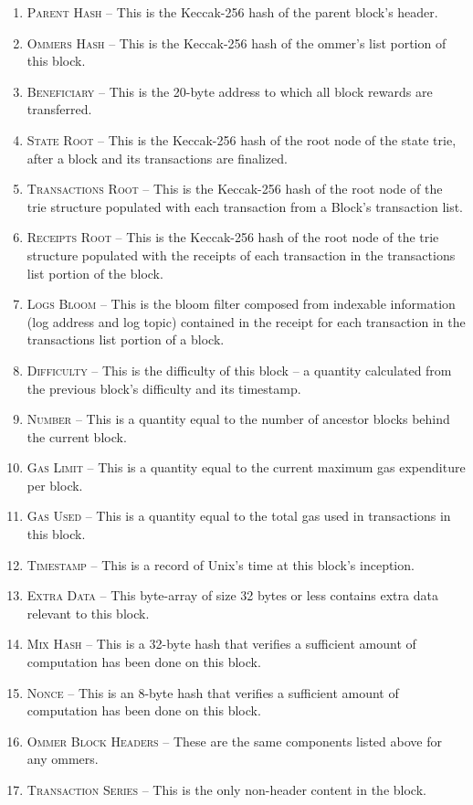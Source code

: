 \documentclass[10pt,a4paper,leqno,bibliography=totoc]{scrartcl}
\newenvironment{alphafootnotes}
{\par\edef\savedfootnotenumber{\number\value{footnote}}
\renewcommand{\thefootnote}{\alph{footnote}}
\setcounter{footnote}{0}}
{\par\setcounter{footnote}{\savedfootnotenumber}}
\begin{document}
\begin{alphafootnotes}
\begin{multicols*}{2}
				\begin{enumerate}
					\item \textsc{Parent Hash} -- This is the Keccak-256 hash of the parent block's header.
					\item \textsc{Ommers Hash} -- This is the Keccak-256 hash of the ommer's list portion of this block.
					\item \textsc{Beneficiary} -- This is the 20-byte address to which all block rewards are transferred.
					\item \textsc{State Root} -- This is the Keccak-256 hash of the root node of the state trie, after a block and its transactions are finalized.
					\item \textsc{Transactions Root} -- This is the Keccak-256 hash of the root node of the trie structure populated with each transaction from a Block's transaction list.
					\item \textsc{Receipts Root} -- This is the Keccak-256 hash of the root node of the trie structure populated with the receipts of each transaction in the transactions list portion of the block.
					\item \textsc{Logs Bloom} -- This is the bloom filter composed from indexable information (log address and log topic) contained in the receipt for each transaction in the transactions list portion of a block.
					\item \textsc{Difficulty} -- This is the difficulty of this block -- a quantity calculated from the previous block's difficulty and its timestamp.
					\item \textsc{Number} -- This is a quantity equal to the number of ancestor blocks behind the current block.
					\item \textsc{Gas Limit} -- This is a quantity equal to the current maximum gas expenditure per block.
					\item \textsc{Gas Used} -- This is a quantity equal to the total gas used in transactions in this block.
					\item \textsc{Timestamp} -- This is a record of Unix's time at this block's inception.
					\item \textsc{Extra Data} -- This byte-array of size 32 bytes or less contains extra data relevant to this block.
					\item \textsc{Mix Hash} -- This is a 32-byte hash that verifies a sufficient amount of computation has been done on this block.
					\item \textsc{Nonce} -- This is an 8-byte hash that verifies a sufficient amount of computation has been done on this block.
					\item \textsc{Ommer Block Headers} -- These are the same components listed above for any ommers.
					\item \textsc{Transaction Series} -- This is the only non-header content in the block.
				\end{enumerate}


\end{multicols*}
\end{alphafootnotes}
\end{document}
